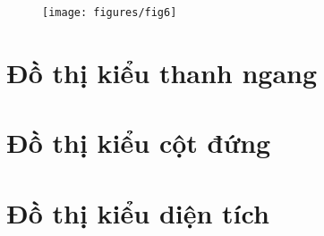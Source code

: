 \begin{figure}[h]
\centering
	\texttt{[image: figures/fig6]}
\end{figure}

\section{Đồ thị kiểu thanh ngang}
\label{sec:thanhngang}

\section{Đồ thị kiểu cột đứng}
\label{sec:cotdung}

\section{Đồ thị kiểu diện tích}
\label{sec:dientich}
